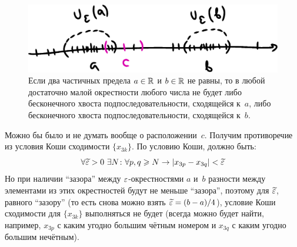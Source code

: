 \documentclass[a4paper,12pt]{article}
\begin{document}
\begin{solution}
    \begin{figure}[ht]
      \centering
      \includegraphics[width=0.6\linewidth]{images/c-somewhere}
      
      \caption{
        Если два частичных предела $a \hm\in \RR$ и $b \hm\in \RR$ не равны, то в любой достаточно малой окрестности любого числа не будет либо бесконечного хвоста подпоследовательности, сходящейся к~$a$, либо бесконечного хвоста подпоследовательности, сходящейся к~$b$.
      }
      \label{fig:c-somewhere}
    \end{figure}
    
    Можно бы было и не думать вообще о расположении~$c$.
    Получим противоречие из условия Коши сходимости $\{x_{3k}\}$.
    По условию Коши, должно быть:
    \[
      \forall \widetilde {\varepsilon} > 0\ \exists N\colon \forall p, q \geqslant N \to |x_{3p} - x_{3q}| < \widetilde {\varepsilon}
    \]
    Но при наличии ``зазора'' между $\varepsilon$-окрестностями $a$ и~$b$ разности между элементами из этих окрестностей будут не меньше ``зазора'', поэтому для $\widetilde {\varepsilon}$, равного ``зазору'' (то есть снова можно взять $\widetilde \eps \hm= (b \hm- a) \hm/ 4$), условие Коши сходимости для $\{x_{3k}\}$ выполняться не будет (всегда можно будет найти, например, $x_{3p}$ с каким угодно большим чётным номером и $x_{3q}$ с каким угодно большим нечётным).
  \end{solution}
  
\end{document}
